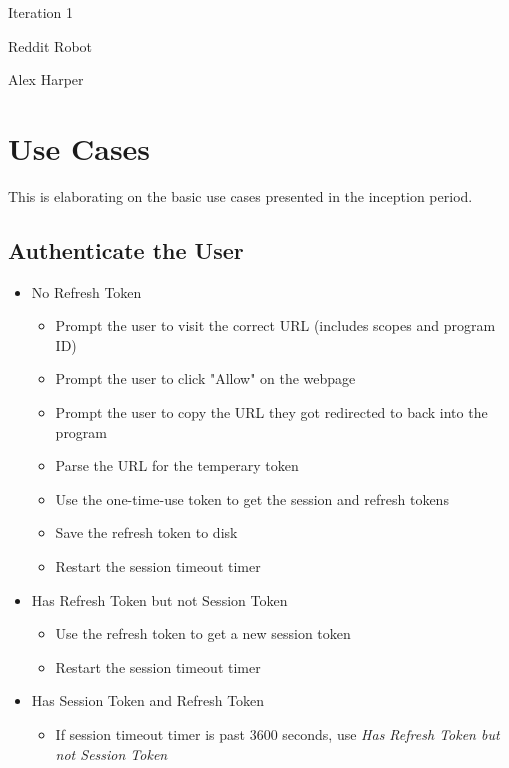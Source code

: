 \documentclass[12pt]{article}
\begin{document}
\begin{titlepage}
	\centering
	{\Huge Iteration 1\par}
	\vspace{0.25in}
	{\Large Reddit Robot\par}
	\vspace{2in}
	{Alex Harper\par}
	\newpage
\end{titlepage}
\tableofcontents
\newpage
{}

\section{Use Cases}

This is elaborating on the basic use cases presented in the inception period.

\hypertarget{Authenticate the User}{
\subsection{Authenticate the User}
}
\begin{itemize}
	\item No Refresh Token
	\begin{itemize}
		\item Prompt the user to visit the correct URL (includes scopes and program ID)
		\item Prompt the user to click "Allow" on the webpage
		\item Prompt the user to copy the URL they got redirected to back into the program
		\item Parse the URL for the temperary token
		\item Use the one-time-use token to get the session and refresh tokens
		\item Save the refresh token to disk
		\item Restart the session timeout timer
	\end{itemize}

	\item Has Refresh Token but not Session Token
	\begin{itemize}
		\item Use the refresh token to get a new session token
		\item Restart the session timeout timer
	\end{itemize}

	\item Has Session Token and Refresh Token
	\begin{itemize}
		\item If session timeout timer is past 3600 seconds, use \textit{Has Refresh Token but not Session Token}
	\end{itemize}
\end{itemize}
\end{document}
